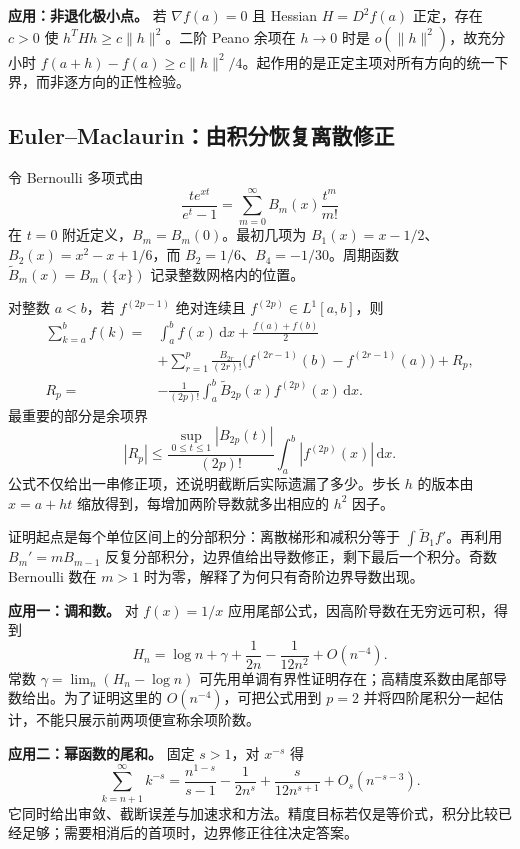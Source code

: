 \documentclass[UTF8,12pt,a4paper,fontset=fandol]{ctexart}
\begin{document}
\textbf{应用：非退化极小点。} 若 $\nabla f(a)=0$ 且 Hessian $H=D^2f(a)$ 正定，存在 $c>0$ 使 $h^THh\geq c\|h\|^2$。二阶 Peano 余项在 $h\to0$ 时是 $o(\|h\|^2)$，故充分小时 $f(a+h)-f(a)\geq c\|h\|^2/4$。起作用的是正定主项对所有方向的统一下界，而非逐方向的正性检验。

\subsection{Euler–Maclaurin：由积分恢复离散修正}

\label{app:taylor-em}

令 Bernoulli 多项式由
\[
\frac{te^{xt}}{e^t-1}=\sum_{m=0}^\infty B_m(x)\frac{t^m}{m!}
\]
在 $t=0$ 附近定义，$B_m=B_m(0)$。最初几项为 $B_1(x)=x-1/2$、$B_2(x)=x^2-x+1/6$，而 $B_2=1/6$、$B_4=-1/30$。周期函数 $\widetilde B_m(x)=B_m(\{x\})$ 记录整数网格内的位置。

对整数 $a<b$，若 $f^{(2p-1)}$ 绝对连续且 $f^{(2p)}\in L^1[a,b]$，则
\[
\begin{aligned}
\sum_{k=a}^bf(k)
={}&\int_a^bf(x)\,\mathrm dx+\frac{f(a)+f(b)}2\\
&+\sum_{r=1}^p\frac{B_{2r}}{(2r)!}
\bigl(f^{(2r-1)}(b)-f^{(2r-1)}(a)\bigr)+R_p,\\
R_p={}&-\frac1{(2p)!}\int_a^b\widetilde B_{2p}(x)f^{(2p)}(x)\,\mathrm dx.
\end{aligned}
\]
最重要的部分是余项界
\[
|R_p|\leq\frac{\sup_{0\leq t\leq1}|B_{2p}(t)|}{(2p)!}
\int_a^b|f^{(2p)}(x)|\,\mathrm dx.
\]
公式不仅给出一串修正项，还说明截断后实际遗漏了多少。步长 $h$ 的版本由 $x=a+ht$ 缩放得到，每增加两阶导数就多出相应的 $h^2$ 因子。

证明起点是每个单位区间上的分部积分：离散梯形和减积分等于 $\int\widetilde B_1f'$。再利用 $B_m'=mB_{m-1}$ 反复分部积分，边界值给出导数修正，剩下最后一个积分。奇数 Bernoulli 数在 $m>1$ 时为零，解释了为何只有奇阶边界导数出现。

\textbf{应用一：调和数。} 对 $f(x)=1/x$ 应用尾部公式，因高阶导数在无穷远可积，得到
\[
H_n=\log n+\gamma+\frac1{2n}-\frac1{12n^2}+O(n^{-4}).
\]
常数 $\gamma=\lim_n(H_n-\log n)$ 可先用单调有界性证明存在；高精度系数由尾部导数给出。为了证明这里的 $O(n^{-4})$，可把公式用到 $p=2$ 并将四阶尾积分一起估计，不能只展示前两项便宣称余项阶数。

\textbf{应用二：幂函数的尾和。} 固定 $s>1$，对 $x^{-s}$ 得
\[
\sum_{k=n+1}^\infty k^{-s}
=\frac{n^{1-s}}{s-1}-\frac1{2n^s}
+\frac{s}{12n^{s+1}}+O_s(n^{-s-3}).
\]
它同时给出审敛、截断误差与加速求和方法。精度目标若仅是等价式，积分比较已经足够；需要相消后的首项时，边界修正往往决定答案。
\end{document}
